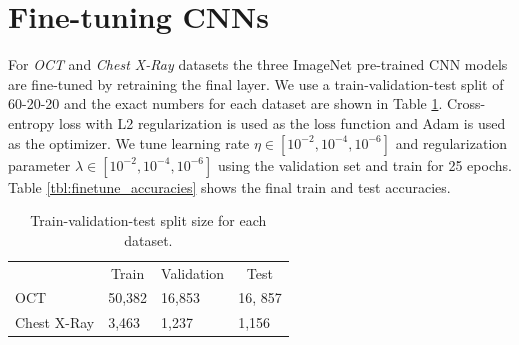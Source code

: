 \section{Fine-tuning CNNs}

For \textit{OCT} and \textit{Chest X-Ray} datasets the three ImageNet pre-trained CNN models are fine-tuned by retraining the final layer.
We use a train-validation-test split of 60-20-20 and the exact numbers for each dataset are shown in Table \ref{tbl:dataset_sizes}.
Cross-entropy loss with L2 regularization is used as the loss function and  Adam \cite{kingma2014adam} is used as the optimizer.
We tune learning rate $\eta \in [10^{-2}, 10^{-4}, 10^{-6}]$ and regularization parameter $\lambda \in [10^{-2}, 10^{-4}, 10^{-6}]$ using the validation set and train for 25 epochs.
Table \ref{tbl:finetune_accuracies} shows the final train and test accuracies.

\begin{table}[ht]
\begin{tabular}{|l|l|l|l|}
\hline
\multirow{2}{*}{} & \multicolumn{1}{c|}{\multirow{2}{*}{Train}} & \multicolumn{1}{c|}{\multirow{2}{*}{Validation}} & \multicolumn{1}{c|}{\multirow{2}{*}{Test}} \\
 & \multicolumn{1}{c|}{} & \multicolumn{1}{c|}{} & \multicolumn{1}{c|}{} \\ \hline
OCT & 50,382 & 16,853 & 16, 857 \\ \hline
Chest X-Ray & 3,463 & 1,237 & 1,156 \\ \hline
\end{tabular}
\caption{Train-validation-test split size for each dataset.}
\label{tbl:dataset_sizes}
\end{table}

